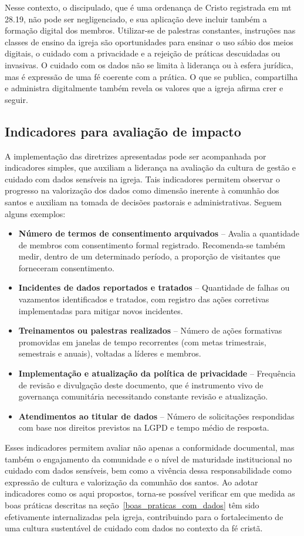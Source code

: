 Nesse contexto, o discipulado, que é uma ordenança de Cristo registrada em \gls{mt} 28.19, não pode ser negligenciado, e sua aplicação deve incluir também a formação digital dos membros. Utilizar-se de palestras constantes, instruções nas classes de ensino da igreja são oportunidades para ensinar o uso sábio dos meios digitais, o cuidado com a privacidade e a rejeição de práticas descuidadas ou invasivas. O cuidado com os dados não se limita à liderança ou à esfera jurídica, mas é expressão de uma fé coerente com a prática. O que se publica, compartilha e administra digitalmente também revela os valores que a igreja afirma crer e seguir.

\subsection{Indicadores para avaliação de impacto}

A implementação das diretrizes apresentadas pode ser acompanhada por indicadores simples, que auxiliam a liderança na avaliação da cultura de gestão e cuidado com dados sensíveis na igreja. Tais indicadores permitem observar o progresso na valorização dos dados como dimensão inerente à comunhão dos santos e auxiliam na tomada de decisões pastorais e administrativas. Seguem alguns exemplos:

\begin{itemize}
    \item \textbf{Número de termos de consentimento arquivados} – Avalia a quantidade de membros com consentimento formal registrado. Recomenda-se também medir, dentro de um determinado período, a proporção de visitantes que forneceram consentimento.
    \item \textbf{Incidentes de dados reportados e tratados} – Quantidade de falhas ou vazamentos identificados e tratados, com registro das ações corretivas implementadas para mitigar novos incidentes.
    \item \textbf{Treinamentos ou palestras realizados} – Número de ações formativas promovidas em janelas de tempo recorrentes (com metas trimestrais, semestrais e anuais), voltadas a líderes e membros.
    \item \textbf{Implementação e atualização da política de privacidade} – Frequência de revisão e divulgação deste documento, que é instrumento vivo de governança comunitária necessitando constante revisão e atualização.
    \item \textbf{Atendimentos ao titular de dados} – Número de solicitações respondidas com base nos direitos previstos na LGPD e tempo médio de resposta.
\end{itemize}

Esses indicadores permitem avaliar não apenas a conformidade documental, mas também o engajamento da comunidade e o nível de maturidade institucional no cuidado com dados sensíveis, bem como a vivência dessa responsabilidade como expressão de cultura e valorização da comunhão dos santos. Ao adotar indicadores como os aqui propostos, torna-se possível verificar em que medida as boas práticas descritas na seção~\ref{boas_praticas_com_dados} têm sido efetivamente internalizadas pela igreja, contribuindo para o fortalecimento de uma cultura sustentável de cuidado com dados no contexto da fé cristã.
